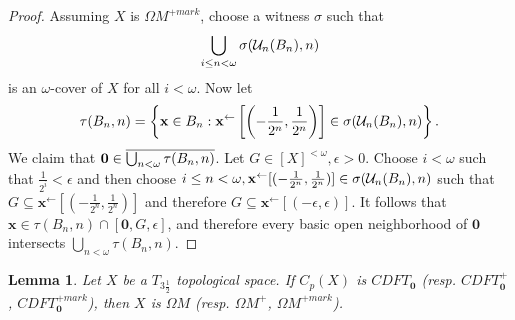 \documentclass{amsart}
\renewcommand{\vec}{\mathbf}
\theoremstyle{plain}
\newtheorem{lemma}[theorem]{Lemma}
\theoremstyle{definition}
\theoremstyle{remark}
\theoremstyle{plain}
\theoremstyle{definition}
\theoremstyle{remark}
\begin{document}
\begin{proof}
  Assuming \(X\) is \(\Omega M^{+mark}\), choose a witness
  \(\sigma\) such that
  \[
    \bigcup_{i\leq n<\omega} \sigma(\mathcal{U}_n(B_n),n)
  \]
  is an \(\omega\)-cover of \(X\) for all \(i<\omega\).
  Now let
  \[
    \tau(B_n,n)
      =
    \left\{
      \vec x\in B_n
    :
      \vec x^{\leftarrow}\left[\left(-\frac{1}{2^n},\frac{1}{2^n}\right)\right]
        \in
      \sigma(\mc U_n(B_n),n)
    \right\}
  .\]
  We claim that \(\vec 0\in\cl{\bigcup_{n<\omega}\tau(B_n,n)}\).
  Let \(G\in[X]^{<\omega},\epsilon>0\). Choose \(i<\omega\) such that
  \(\frac{1}{2^i}<\epsilon\) and then choose
  \(i\leq n<\omega,\vec x^{\leftarrow}[(-\frac{1}{2^n},\frac{1}{2^n})]\in\sigma(\mc U_n(B_n),n)\)
  such that \(G\subseteq \vec x^{\leftarrow}[(-\frac{1}{2^n},\frac{1}{2^n})]\)
  and therefore \(G\subseteq \vec x^{\leftarrow}[(-\epsilon,\epsilon)]\).
  It follows that \(\vec x\in \tau(B_n,n)\cap[\vec 0,G,\epsilon]\), and therefore
  every basic open neighborhood of \(\vec 0\) intersects
  \(\bigcup_{n<\omega}\tau(B_n,n)\).
\end{proof}

\begin{lemma}
  Let \(X\) be a \(T_{3\frac{1}{2}}\) topological space.
  If \(C_p(X)\) is \(CDFT_{\vec 0}\)
  (resp. \(CDFT_{\vec 0}^+\), \(CDFT_{\vec 0}^{+mark}\)),
  then \(X\) is \(\Omega M\)
  (resp. \(\Omega M^+\), \(\Omega M^{+mark}\)).
\end{lemma}
\end{document}
